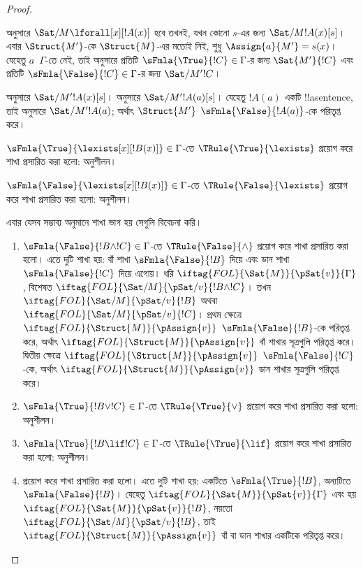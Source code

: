 \documentclass[../../../include/open-logic-section]{subfiles}
\begin{document}
\begin{proof}
\begin{enumerate}
{   অনুসারে
  $\Sat/{M}{\lforall[x][!A(x)]}$ হবে তখনই, যখন কোনো $s$-এর জন্য
  $\Sat/{M}{!A(x)}[s]$। এবার $\Struct{M'}$-কে $\Struct{M}$-এর মতোই
  নিই, শুধু $\Assign{a}{M'} = s(x)$। যেহেতু $a$~$\Gamma$-তে নেই,
  তাই  অনুসারে প্রতিটি
  $\sFmla{\True}{!C} \in \Gamma$-র জন্য $\Sat{M'}{!C}$ এবং প্রতিটি
  $\sFmla{\False}{!C} \in \Gamma$-র জন্য $\Sat/{M'}{!C}$।

   অনুসারে
  $\Sat/{M'}{!A(x)}[s]$।  অনুসারে
  $\Sat/{M'}{!A(a)}[s]$। যেহেতু $!A(a)$ একটি !!a{sentence}, তাই
   অনুসারে
  $\Sat/{M'}{!A(a)}$; অর্থাৎ $\Struct{M'}$
  $\sFmla{\False}{!A(a)}$-কে পরিতৃপ্ত করে।
\item $\sFmla{\True}{\lexists[x][!B(x)]} \in \Gamma$-তে
  $\TRule{\True}{\lexists}$ প্রয়োগ করে শাখা প্রসারিত করা হলো:
  অনুশীলন।
\item $\sFmla{\False}{\lexists[x][!B(x)]} \in \Gamma$-তে
  $\TRule{\False}{\lexists}$ প্রয়োগ করে শাখা প্রসারিত করা হলো:
  অনুশীলন।}{}
\end{enumerate}
এবার যেসব সম্ভাব্য অনুমানে শাখা ভাগ হয় সেগুলি বিবেচনা করি।
\begin{enumerate}
\item $\sFmla{\False}{!B \land !C} \in \Gamma$-তে
  $\TRule{\False}{\land}$ প্রয়োগ করে শাখা প্রসারিত করা হলো। এতে দুটি
  শাখা হয়: বাঁ শাখা $\sFmla{\False}{!B}$ দিয়ে এবং ডান শাখা
  $\sFmla{\False}{!C}$ দিয়ে এগোয়। ধরি
  $\iftag{FOL}{\Sat{M}}{\pSat{v}}{\Gamma}$, বিশেষত
  $\iftag{FOL}{\Sat/{M}}{\pSat/{v}}{!B \land !C}$। তখন
  $\iftag{FOL}{\Sat/{M}}{\pSat/{v}}{!B}$ অথবা
  $\iftag{FOL}{\Sat/{M}}{\pSat/{v}}{!C}$। প্রথম ক্ষেত্রে
  $\iftag{FOL}{\Struct{M}}{\pAssign{v}}$
  $\sFmla{\False}{!B}$-কে পরিতৃপ্ত করে, অর্থাৎ
  $\iftag{FOL}{\Struct{M}}{\pAssign{v}}$ বাঁ শাখার সূত্রগুলি
  পরিতৃপ্ত করে। দ্বিতীয় ক্ষেত্রে
  $\iftag{FOL}{\Struct{M}}{\pAssign{v}}$
  $\sFmla{\False}{!C}$-কে, অর্থাৎ
  $\iftag{FOL}{\Struct{M}}{\pAssign{v}}$ ডান শাখার সূত্রগুলি পরিতৃপ্ত করে।
\item $\sFmla{\True}{!B \lor !C} \in \Gamma$-তে
  $\TRule{\True}{\lor}$ প্রয়োগ করে শাখা প্রসারিত করা হলো: অনুশীলন।
\item $\sFmla{\True}{!B \lif !C} \in \Gamma$-তে
  $\TRule{\True}{\lif}$ প্রয়োগ করে শাখা প্রসারিত করা হলো: অনুশীলন।
\item \Cut{} প্রয়োগ করে শাখা প্রসারিত করা হলো। এতে দুটি শাখা হয়:
  একটিতে $\sFmla{\True}{!B}$, অন্যটিতে $\sFmla{\False}{!B}$।
  যেহেতু $\iftag{FOL}{\Sat{M}}{\pSat{v}}{\Gamma}$ এবং হয়
  $\iftag{FOL}{\Sat{M}}{\pSat{v}}{!B}$, নয়তো
  $\iftag{FOL}{\Sat/{M}}{\pSat/{v}}{!B}$, তাই
  $\iftag{FOL}{\Struct{M}}{\pAssign{v}}$ বাঁ বা ডান শাখার একটিকে
  পরিতৃপ্ত করে।
\end{enumerate}
\end{proof}
\end{document}
